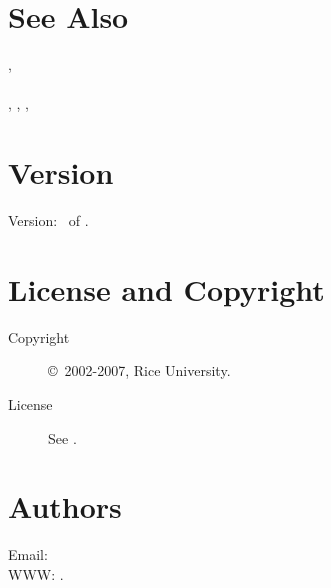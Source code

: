 \documentclass[english]{article}
\begin{document}


\section{See Also}

,  \\
 \\
, , ,  \\ %

\section{Version}

Version: \Version\ of \Date.

\section{License and Copyright}

\begin{description}
\item[Copyright] \copyright\ 2002-2007, Rice University.
\item[License] See .
\end{description}

\section{Authors}

Email:  \\
WWW: .

\LatexManEnd
\end{document}
